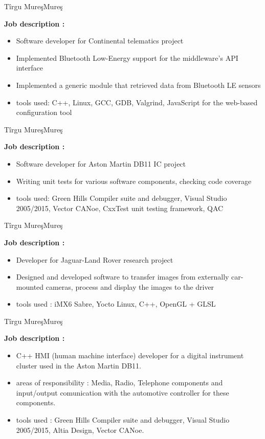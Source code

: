 \documentclass[14pt,a4paper,sans]{moderncv}   %
\begin{document}
 {T\^{i}rgu Mure\c{s}}{Mure\c{s}}{
\textbf{Job description :}
\begin{itemize}
\item Software developer for Continental telematics project
\item Implemented Bluetooth Low-Energy support for the middleware's API interface
\item Implemented a generic module that retrieved data from Bluetooth LE sensors
\item tools used: C++, Linux, GCC, GDB, Valgrind, JavaScript for the web-based configuration tool
\end{itemize}}


 {T\^{i}rgu Mure\c{s}}{Mure\c{s}}{
\textbf{Job description :}
\begin{itemize}
\item Software developer for Aston Martin DB11 IC project
\item Writing unit tests for various software components, checking code coverage
\item tools used: Green Hills Compiler suite and debugger, Visual Studio
2005/2015, Vector CANoe, CxxTest unit testing framework, QAC
\end{itemize}}


 {T\^{i}rgu Mure\c{s}}{Mure\c{s}}{
\textbf{Job description :}
\begin{itemize}
\item Developer for Jaguar-Land Rover research project
\item Designed and developed software to transfer images from externally car-mounted cameras, process and display the images to the driver
\item tools used : iMX6 Sabre, Yocto Linux, C++, OpenGL + GLSL
\end{itemize}}

 {T\^{i}rgu Mure\c{s}}{Mure\c{s}}{
\textbf{Job description :}
\begin{itemize}
\item C++ HMI (human machine interface) developer for a digital instrument
cluster used in the Aston Martin DB11. 
\item areas of responsibility : Media, Radio, Telephone components and
input/output comunication with the automotive controller for these components. 
\item tools used : Green Hills Compiler suite and debugger, Visual Studio
2005/2015, Altia Design, Vector CANoe.
\end{itemize}}
\end{document}
